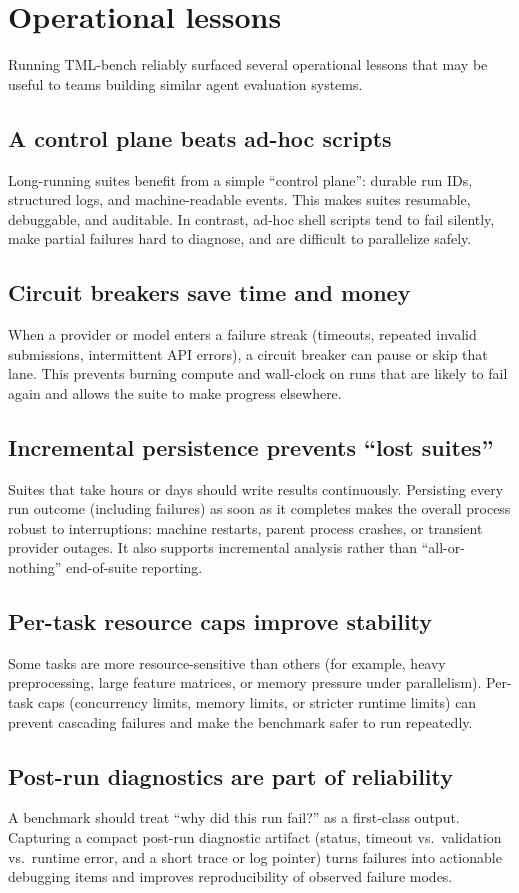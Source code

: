 \clearpage
\section{Operational lessons}
\label{sec:appendix-operational}

Running TML-bench reliably surfaced several operational lessons that may be useful to teams building similar agent evaluation systems.

\subsection{A control plane beats ad-hoc scripts}
Long-running suites benefit from a simple ``control plane'': durable run IDs, structured logs, and machine-readable events. This makes suites resumable, debuggable, and auditable. In contrast, ad-hoc shell scripts tend to fail silently, make partial failures hard to diagnose, and are difficult to parallelize safely.

\subsection{Circuit breakers save time and money}
When a provider or model enters a failure streak (timeouts, repeated invalid submissions, intermittent API errors), a circuit breaker can pause or skip that lane. This prevents burning compute and wall-clock on runs that are likely to fail again and allows the suite to make progress elsewhere.

\subsection{Incremental persistence prevents ``lost suites''}
Suites that take hours or days should write results continuously. Persisting every run outcome (including failures) as soon as it completes makes the overall process robust to interruptions: machine restarts, parent process crashes, or transient provider outages. It also supports incremental analysis rather than ``all-or-nothing'' end-of-suite reporting.

\subsection{Per-task resource caps improve stability}
Some tasks are more resource-sensitive than others (for example, heavy preprocessing, large feature matrices, or memory pressure under parallelism). Per-task caps (concurrency limits, memory limits, or stricter runtime limits) can prevent cascading failures and make the benchmark safer to run repeatedly.

\subsection{Post-run diagnostics are part of reliability}
A benchmark should treat ``why did this run fail?'' as a first-class output. Capturing a compact post-run diagnostic artifact (status, timeout vs.\ validation vs.\ runtime error, and a short trace or log pointer) turns failures into actionable debugging items and improves reproducibility of observed failure modes.

